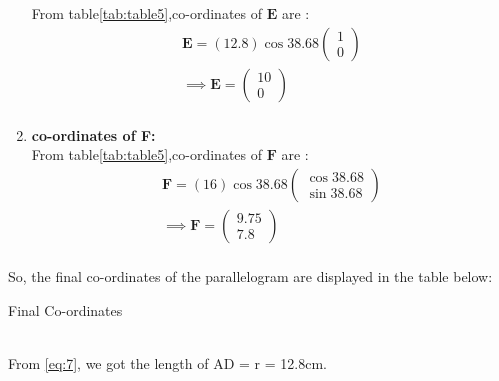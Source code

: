 \documentclass{article}
\newcommand{\myvec}[1]{\ensuremath{\begin{pmatrix}#1\end{pmatrix}}}
\let\vec\mathbf
\begin{document}
\begin{enumerate}
		From table\ref{tab:table5},co-ordinates of $\vec{E}$ are :\\
		\begin{align}
			\vec{E} = (12.8)\cos{38.68}\myvec{1\\0}\\
			\implies \vec{E} = \myvec{10\\0}\\
		\end{align}
	\item \textbf{co-ordinates of F:}\\
		From table\ref{tab:table5},co-ordinates of $\vec{F}$ are :\\
		\begin{align}
			\vec{F} = (16)\cos{38.68}\myvec{\cos{38.68}\\\sin{38.68}}\\
			\implies \vec{F} = \myvec{9.75\\7.8}\\
		\end{align}
\end{enumerate}
So, the final co-ordinates of the  parallelogram are displayed in the table below:\\
\begin{table}[h]
	\centering
	
	\caption{Final Co-ordinates}
	\label{tab:table7}
\end{table}\\
From \ref{eq:7}, we got the length of AD = r = 12.8cm.
\end{document}
